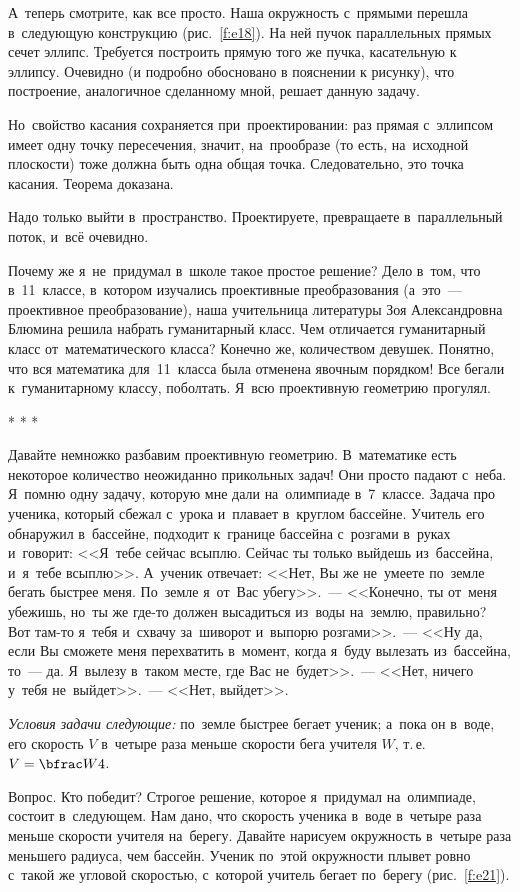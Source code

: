 А~теперь смотрите, как все просто. Наша окружность с~прямыми перешла в~следующую конструкцию
(рис.~\ref{f:e18}). На ней пучок параллельных прямых сечет эллипс. Требуется построить прямую того же
пучка, касательную к эллипсу. Очевидно (и подробно обосновано в пояснении к рисунку), что построение,
аналогичное сделанному мной, решает данную задачу.

Но~свойство касания сохраняется при~проектировании: раз прямая с~эллипсом имеет одну точку
пересечения, значит, на~прообразе (то есть, на~исходной плоскости) тоже должна быть одна общая
точка. Следовательно, это точка касания. Теорема до\-ка\-зана.

Надо только выйти в~пространство. Проектируете, превращаете в~параллельный поток, и~всё очевидно.

Почему же я~не~придумал в~школе такое простое решение? Дело в~том, что в~11~классе,
в~котором изучались проективные преобразования (а~это~--- проективное преобразование), наша
учительница литературы Зоя Александровна Блюмина решила набрать гуманитарный класс. Чем отличается
гуманитарный класс от~математического класса? Конечно же, количеством девушек. Понятно, что вся
математика для~11~класса была отменена явочным порядком! Все бегали к~гуманитарному
классу, поболтать. Я~всю проективную геометрию прогулял.

\centerline{* * *}

Давайте немножко разбавим проективную геометрию. В~математике есть некоторое количество неожиданно
прикольных задач! Они просто падают с~неба. Я~помню одну задачу, которую мне дали на~олимпиаде
в~7~классе. Задача про ученика, который сбежал с~урока и~плавает в~круглом бассейне. Учитель
его обнаружил в~бассейне, подходит к~границе бассейна с~розгами в~руках и~говорит: <<Я~тебе сейчас
всыплю. Сейчас ты только выйдешь из~бассейна, и~я~тебе всыплю>>. А~ученик отвечает: <<Нет, Вы же
не~умеете по~земле бегать быстрее меня. По~земле я~от~Вас убегу>>.~--- <<Конечно, ты от~меня убежишь,
но~ты же где-то должен высадиться из~воды на~землю, правильно? Вот там-то я~тебя и~схвачу
за~шиворот и~выпорю розгами>>.~--- <<Ну да, если Вы сможете меня перехватить в~момент, когда я~буду
вылезать из~бассейна, то~--- да. Я~вылезу в~таком месте, где Вас не~будет>>.~--- <<Нет, ничего у~тебя
не~выйдет>>.~--- <<Нет, выйдет>>.

\textit{Условия задачи следующие:} по~земле быстрее бегает ученик; а~пока он в~воде, его скорость $V$
 в~четыре раза меньше скорости бега учителя $W$, т.\,е. $V=\bfrac W4$.


Вопрос. Кто победит? Строгое решение, которое я~придумал на~олимпиаде, состоит в~следующем. Нам
дано, что скорость ученика в~воде в~четыре раза меньше скорости учителя на~берегу. Давайте нарисуем
окружность в~четыре раза меньшего радиуса, чем бассейн. Ученик по~этой окружности плывет ровно
с~такой же угловой скоростью, с~которой учитель бегает по~берегу (рис.~\ref{f:e21}).

